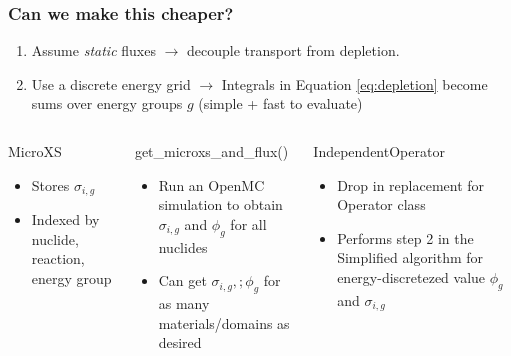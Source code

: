 \begin{frame}
  \frametitle{Can we make this cheaper?}
  \begin{enumerate}
      \item Assume {\it static} fluxes $\rightarrow$ decouple transport from
    depletion.
      \item Use a discrete energy grid $\rightarrow$ Integrals in Equation
          \ref{eq:depletion} become sums over energy groups $g$ (simple + fast to evaluate)
  \end{enumerate}
        
    \begin{columns}
            \column[t]{5cm}
                \begin{block}{MicroXS}
                    \begin{itemize}
                        \item Stores $\sigma_{i,g}$
                        \item Indexed by nuclide, reaction, energy group
                    \end{itemize}
                \end{block}

                \begin{block}{get\_microxs\_and\_flux()}
                    \begin{itemize}
                        \item Run an OpenMC simulation to obtain $\sigma_{i,g}$
                            and $\phi_{g}$ for all nuclides
                        \item Can get $\sigma_{i,g},; \phi_{g}$ for as many
                            materials/domains as desired
                    \end{itemize}
                \end{block}
            \column[t]{5cm}
                \begin{block}{IndependentOperator}
                    \begin{itemize} 
                        \item Drop in replacement for Operator class
                        \item Performs step 2 in the Simplified algorithm for
                            energy-discretezed value $\phi_{g}$ and $\sigma_{i,g}$
                    \end{itemize}
                \end{block}
    \end{columns}
    \begin{center}
    \end{center}
\end{frame}
